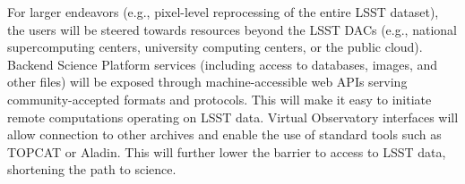 \documentclass[DM,lsstdraft,toc]{lsstdoc}
\begin{document}
For larger endeavors (e.g., pixel-level reprocessing of the entire LSST
dataset), the users will be steered towards resources beyond the LSST DACs
(e.g., national supercomputing centers, university computing centers, or the
public cloud).  Backend Science Platform services (including access to
databases, images, and other files) will be exposed through
machine-accessible web APIs serving community-accepted formats and
protocols.  This will make it easy to initiate remote computations operating
on LSST data.  Virtual Observatory interfaces will allow connection to other
archives and enable the use of standard tools such as TOPCAT or Aladin. 
This will further lower the barrier to access to LSST data, shortening the
path to science.



\end{document}
